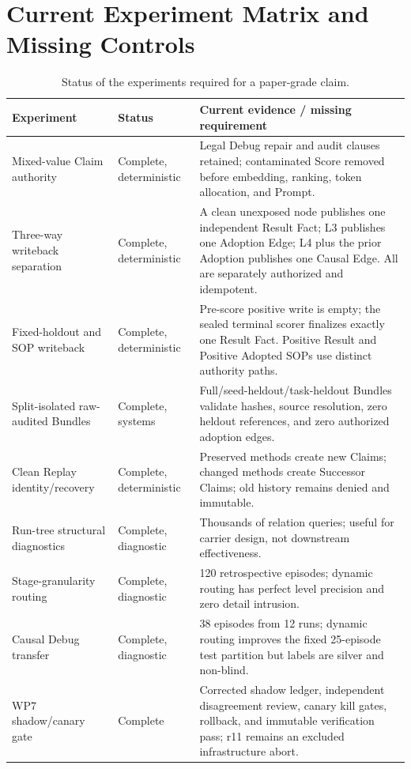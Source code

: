 \documentclass{article}
\begin{document}
\section{Current Experiment Matrix and Missing Controls}

\begin{table}[h]
\caption{Status of the experiments required for a paper-grade claim.}
\centering
\scriptsize
\begin{tabular}{p{}p{}p{}}
\toprule
Experiment & Status & Current evidence / missing requirement \\
\midrule
Mixed-value Claim authority & Complete, deterministic & Legal Debug repair and audit clauses retained; contaminated Score removed before embedding, ranking, token allocation, and Prompt. \\
Three-way writeback separation & Complete, deterministic & A clean unexposed node publishes one independent Result Fact; L3 publishes one Adoption Edge; L4 plus the prior Adoption publishes one Causal Edge.  All are separately authorized and idempotent. \\
Fixed-holdout and SOP writeback & Complete, deterministic & Pre-score positive write is empty; the sealed terminal scorer finalizes exactly one Result Fact.  Positive Result and Positive Adopted SOPs use distinct authority paths. \\
Split-isolated raw-audited Bundles & Complete, systems & Full/seed-heldout/task-heldout Bundles validate hashes, source resolution, zero heldout references, and zero authorized adoption edges. \\
Clean Replay identity/recovery & Complete, deterministic & Preserved methods create new Claims; changed methods create Successor Claims; old history remains denied and immutable. \\
Run-tree structural diagnostics & Complete, diagnostic & Thousands of relation queries; useful for carrier design, not downstream effectiveness. \\
Stage-granularity routing & Complete, diagnostic & 120 retrospective episodes; dynamic routing has perfect level precision and zero detail intrusion. \\
Causal Debug transfer & Complete, diagnostic & 38 episodes from 12 runs; dynamic routing improves the fixed 25-episode test partition but labels are silver and non-blind. \\
WP7 shadow/canary gate & Complete & Corrected shadow ledger, independent disagreement review, canary kill gates, rollback, and immutable verification pass; r11 remains an excluded infrastructure abort. \\

\end{tabular}
\end{table}
\end{document}
